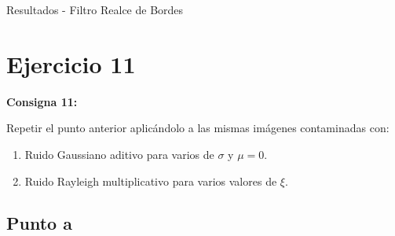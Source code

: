 \documentclass{beamer}
\begin{document}
\begin{frame}[fragile]{Resultados - Filtro Realce de Bordes}
\begin{minipage}{0.45\linewidth}
		\label{fig:lenaej10e}
	\end{minipage}
\end{frame}

\section{Ejercicio 11}

\begin{frame}
	\begin{center}
		\textcolor{unahurverde}{\textbf{Consigna 11:}}
	\end{center}
	\justifying
	
	Repetir el punto anterior aplicándolo a las mismas imágenes contaminadas con:
	
	\begin{enumerate}
		\item Ruido Gaussiano aditivo para varios de $\sigma$ y $\mu = 0$.
		\item Ruido Rayleigh multiplicativo para varios valores de $\xi$. 
	\end{enumerate}
\end{frame}

\subsection{Punto a}
\end{document}
